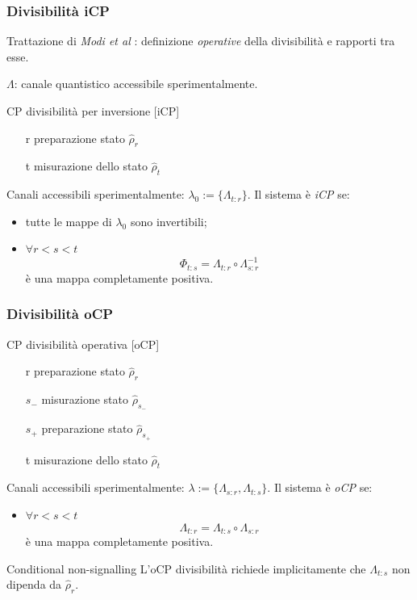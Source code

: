 \documentclass{beamer}
\begin{document}
\begin{frame}
\frametitle{Divisibilità iCP}
Trattazione di \emph{Modi et al} \cite{CPdoesnotimply}: definizione \emph{operative} della divisibilità e rapporti tra esse.

\(\Lambda \): canale quantistico accessibile sperimentalmente.
\pause
\begin{block}{CP divisibilità per inversione [iCP]}
	\begin{itemize}
		\item[r] preparazione stato \(\hat{\rho}_r\)
		\item[t] misurazione dello stato \(\hat{\rho}_t\)
	\end{itemize}
 Canali accessibili sperimentalmente: \(\lambda_0 := \{\Lambda_{t\colon r}\}\). Il sistema è \emph{iCP} se:
 \begin{itemize}
    	\item tutte le mappe di \(\lambda_0\) sono invertibili;
    	\item \(\forall r<s<t\)
 	      \[\Phi_{t\colon s} = \Lambda_{t\colon r} \circ \Lambda^{-1}_{s\colon r}\]
 	      è una mappa completamente positiva.
 \end{itemize}
\end{block}

\end{frame}

\begin{frame}
\frametitle{Divisibilità oCP}
\begin{block}{CP divisibilità operativa [oCP]}
	\begin{itemize}
		\item[r] preparazione stato \(\hat{\rho}_r\)
		\item[\(s_-\)] misurazione stato \(\hat{\rho}_{s_-}\)
		\item[\(s_+\)] preparazione stato \(\hat{\rho}_{s_+}\)
		\item[t] misurazione dello stato \(\hat{\rho}_t\)
	\end{itemize}
	Canali accessibili sperimentalmente: \(\lambda := \{\Lambda_{s\colon r},\Lambda_{t\colon s}\}\). Il sistema è \emph{oCP} se:
	\begin{itemize}
		\item \(\forall r<s<t\)
		\[\Lambda_{t\colon r} = \Lambda_{t\colon s} \circ \Lambda_{s\colon r}\]
		è una mappa completamente positiva.
	\end{itemize}
\end{block}
\pause
\begin{exampleblock}{Conditional non-signalling}
	L'oCP divisibilità richiede implicitamente che \(\Lambda_{t\colon s}\) non dipenda da \(\hat{\rho}_r\).
\end{exampleblock}
\end{frame}
\end{document}
